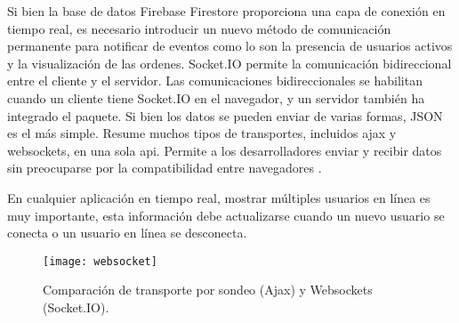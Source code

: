 Si bien la base de datos Firebase Firestore proporciona una capa de conexión en tiempo real, es necesario introducir un nuevo método de comunicación permanente para notificar de eventos como lo son la presencia de usuarios activos y la visualización de las ordenes. Socket.IO permite la comunicación bidireccional entre el cliente y el servidor. Las comunicaciones bidireccionales se habilitan cuando un cliente tiene Socket.IO en el navegador, y un servidor también ha integrado el paquete. Si bien los datos se pueden enviar de varias formas, JSON es el más simple. Resume muchos tipos de transportes, incluidos \acrshort{ajax}  y \Glspl{websocket}, en una sola \acrshort{api}. Permite a los desarrolladores enviar y recibir datos sin preocuparse por la compatibilidad entre navegadores \cite{kelleher}.
\vspace{0.8cm}

En cualquier aplicación en tiempo real, mostrar múltiples usuarios en línea es muy importante, esta información debe actualizarse cuando un nuevo usuario se conecta o un usuario en línea se desconecta.
\vspace{0.8cm}

\begin{figure}[H]
  \centering
  \texttt{[image: websocket]}
  \caption{Comparación de transporte por sondeo (Ajax) y Websockets (Socket.IO).}
\end{figure}

